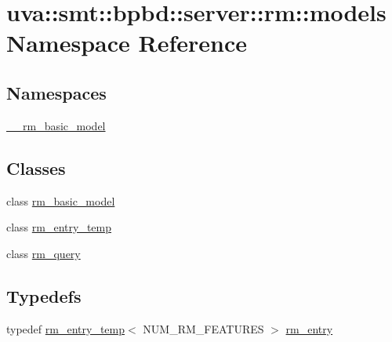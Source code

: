 \hypertarget{namespaceuva_1_1smt_1_1bpbd_1_1server_1_1rm_1_1models}{}\section{uva\+:\+:smt\+:\+:bpbd\+:\+:server\+:\+:rm\+:\+:models Namespace Reference}
\label{namespaceuva_1_1smt_1_1bpbd_1_1server_1_1rm_1_1models}
\subsection*{Namespaces}
\begin{DoxyCompactItemize}
\item 
 \hyperlink{namespaceuva_1_1smt_1_1bpbd_1_1server_1_1rm_1_1models_1_1____rm__basic__model}{\+\_\+\+\_\+rm\+\_\+basic\+\_\+model}
\end{DoxyCompactItemize}
\subsection*{Classes}
\begin{DoxyCompactItemize}
\item 
class \hyperlink{classuva_1_1smt_1_1bpbd_1_1server_1_1rm_1_1models_1_1rm__basic__model}{rm\+\_\+basic\+\_\+model}
\item 
class \hyperlink{classuva_1_1smt_1_1bpbd_1_1server_1_1rm_1_1models_1_1rm__entry__temp}{rm\+\_\+entry\+\_\+temp}
\item 
class \hyperlink{classuva_1_1smt_1_1bpbd_1_1server_1_1rm_1_1models_1_1rm__query}{rm\+\_\+query}
\end{DoxyCompactItemize}
\subsection*{Typedefs}
\begin{DoxyCompactItemize}
\item 
typedef \hyperlink{classuva_1_1smt_1_1bpbd_1_1server_1_1rm_1_1models_1_1rm__entry__temp}{rm\+\_\+entry\+\_\+temp}$<$ N\+U\+M\+\_\+\+R\+M\+\_\+\+F\+E\+A\+T\+U\+R\+E\+S $>$ \hyperlink{namespaceuva_1_1smt_1_1bpbd_1_1server_1_1rm_1_1models_a67353bb21590b2a2adf05500899439ed}{rm\+\_\+entry}
\end{DoxyCompactItemize}
